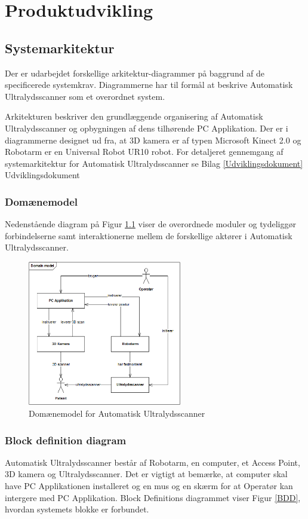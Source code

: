 \chapter{Produktudvikling}\label{Produktudvikling} 

\section{Systemarkitektur}\label{Systemarkitektur}
Der er udarbejdet forskellige arkitektur-diagrammer på baggrund af de specificerede systemkrav. Diagrammerne har til formål at beskrive Automatisk Ultralydsscanner som et overordnet system.

Arkitekturen beskriver den grundlæggende organisering af Automatisk Ultralydsscanner og opbygningen af dens tilhørende PC Applikation. Der er i diagrammerne designet ud fra, at 3D kamera er af typen Microsoft Kinect 2.0 og Robotarm er en Universal Robot UR10 robot. For detaljeret gennemgang af systemarkitektur for Automatisk Ultralydsscanner se Bilag  \ref{Udviklingsdokument} Udviklingsdokument
\subsection{Domænemodel}
Nedenstående diagram på Figur \ref{domain} viser de overordnede moduler og tydeliggør forbindelserne samt interaktionerne mellem de forskellige aktører i Automatisk Ultralydsscanner. 

\begin{figure}[H]
    \centering
    \includegraphics[width=0.6\textwidth]{figurer/d/Design/uml_domain}
    \caption{Domænemodel for Automatisk Ultralydsscanner}
    \label{domain}
\end{figure}

\subsection{Block definition diagram}
Automatisk Ultralydsscanner består af Robotarm, en computer, et Access Point, 3D kamera og Ultralydsscanner. Det er vigtigt at bemærke, at computer skal have PC Applikationen installeret og en mus og en skærm for at Operatør kan intergere med PC Applikation. Block Definitions diagrammet viser Figur \ref{BDD}, hvordan systemets blokke er forbundet. 

